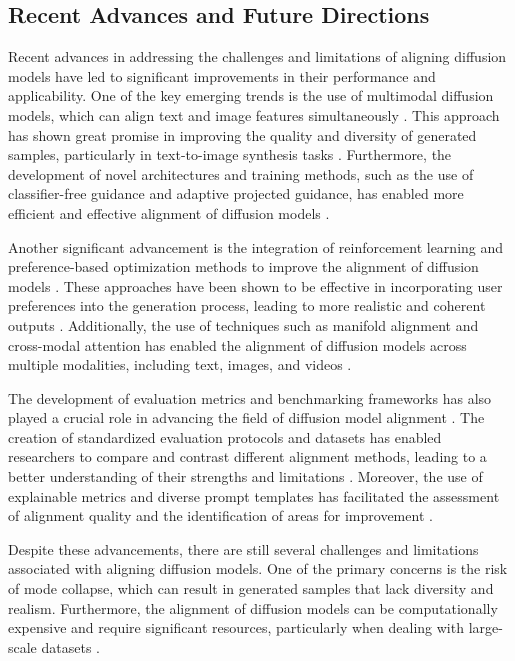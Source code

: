 \documentclass[11pt,a4paper]{article}
\begin{document}
\subsection{Recent Advances and Future Directions}


Recent advances in addressing the challenges and limitations of aligning diffusion models have led to significant improvements in their performance and applicability. One of the key emerging trends is the use of multimodal diffusion models, which can align text and image features simultaneously \cite{doi:10.18653/v1/d19-1136}. This approach has shown great promise in improving the quality and diversity of generated samples, particularly in text-to-image synthesis tasks \cite{doi:10.1109/cvpr52729.2023.02154}. Furthermore, the development of novel architectures and training methods, such as the use of classifier-free guidance and adaptive projected guidance, has enabled more efficient and effective alignment of diffusion models \cite{doi:10.3115/981574.981575}.

Another significant advancement is the integration of reinforcement learning and preference-based optimization methods to improve the alignment of diffusion models \cite{doi:10.3115/990820.990835}. These approaches have been shown to be effective in incorporating user preferences into the generation process, leading to more realistic and coherent outputs \cite{doi:10.3115/1220575.1220585}. Additionally, the use of techniques such as manifold alignment and cross-modal attention has enabled the alignment of diffusion models across multiple modalities, including text, images, and videos \cite{arxiv:1705.09655}.

The development of evaluation metrics and benchmarking frameworks has also played a crucial role in advancing the field of diffusion model alignment \cite{doi:10.1109/tvcg.2020.3028975}. The creation of standardized evaluation protocols and datasets has enabled researchers to compare and contrast different alignment methods, leading to a better understanding of their strengths and limitations \cite{arxiv:2508.09937}. Moreover, the use of explainable metrics and diverse prompt templates has facilitated the assessment of alignment quality and the identification of areas for improvement \cite{arxiv:2408.13006}.

Despite these advancements, there are still several challenges and limitations associated with aligning diffusion models. One of the primary concerns is the risk of mode collapse, which can result in generated samples that lack diversity and realism. Furthermore, the alignment of diffusion models can be computationally expensive and require significant resources, particularly when dealing with large-scale datasets \cite{arxiv:2502.06805}.
\end{document}
